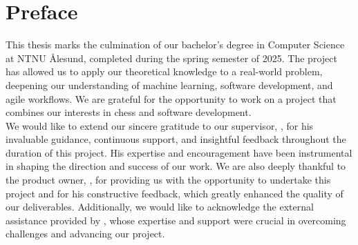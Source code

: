 \chapter*{Preface}

This thesis marks the culmination of our bachelor's degree in Computer Science at NTNU Ålesund, completed during the spring semester of 2025. The project has allowed us to apply our theoretical knowledge to a real-world problem, deepening our understanding of machine learning, software development, and agile workflows. We are grateful for the opportunity to work on a project that combines our interests in chess and software development. \\

We would like to extend our sincere gratitude to our supervisor, \textbf{\saleh}, for his invaluable guidance, continuous support, and insightful feedback throughout the duration of this project. His expertise and encouragement have been instrumental in shaping the direction and success of our work. We are also deeply thankful to the product owner, \textbf{\arne}, for providing us with the opportunity to undertake this project and for his constructive feedback, which greatly enhanced the quality of our deliverables. Additionally, we would like to acknowledge the external assistance provided by \textbf{\peter}, whose expertise and support were crucial in overcoming challenges and advancing our project.